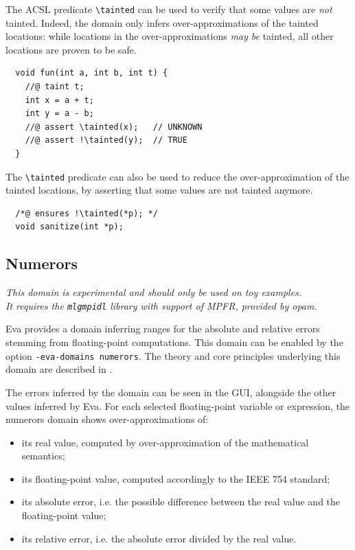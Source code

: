 \documentclass[web]{frama-c-book}
\newcommand{\Eva}{\textsf{Eva}}
\begin{document}
The ACSL predicate \lstinline|\tainted| can be used to verify that some
values are \emph{not} tainted.
Indeed, the domain only infers over-approximations of the tainted locations:
while locations in the over-approximations \emph{may be} tainted,
all other locations are proven to be safe.

\begin{lstlisting}
  void fun(int a, int b, int t) {
    //@ taint t;
    int x = a + t;
    int y = a - b;
    //@ assert \tainted(x);   // UNKNOWN
    //@ assert !\tainted(y);  // TRUE
  }
\end{lstlisting}

The \lstinline|\tainted| predicate can also be used to reduce the
over-approximation of the tainted locations, by asserting that some values are
not tainted anymore.

\begin{lstlisting}
  /*@ ensures !\tainted(*p); */
  void sanitize(int *p);
\end{lstlisting}


\subsection{Numerors}
\label{sec:numerors}

\emph{This domain is experimental and should only be used on toy examples.\\
  It requires the \texttt{mlgmpidl} library with support of MPFR,
  provided by opam.}

\Eva{} provides a domain inferring ranges for the absolute and relative errors
stemming from floating-point computations. This domain can be enabled by the
option \texttt{-eva-domains numerors}. The theory and core principles underlying
this domain are described in \cite{DBLP:conf/sas/JacqueminPV18}.

The errors inferred by the domain can be seen in the GUI, alongside the other
values inferred by \Eva{}.
For each selected floating-point variable or expression, the numerors domain
shows over-approximations of:
\begin{itemize}
\item its real value, computed by over-approximation of the mathematical
  semantics;
\item its floating-point value, computed accordingly to the IEEE 754 standard;
\item its absolute error, i.e. the possible difference between the real value
  and the floating-point value;
\item its relative error, i.e. the absolute error divided by the real value.
\end{itemize}
\end{document}
